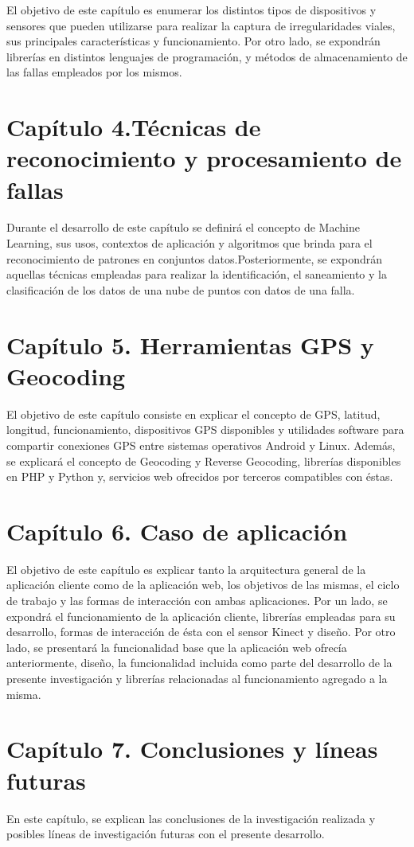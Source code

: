El objetivo de este capítulo es enumerar los distintos tipos de dispositivos y sensores que pueden utilizarse para realizar la captura de irregularidades viales, sus principales características y funcionamiento. 
Por otro lado, se expondrán librerías en distintos lenguajes de programación, y métodos de almacenamiento de las fallas empleados por los mismos.

\section*{Capítulo 4.Técnicas de reconocimiento y procesamiento de fallas}

Durante el desarrollo de este capítulo se definirá el concepto de Machine Learning, sus usos, contextos de aplicación y algoritmos que brinda para el reconocimiento de patrones en conjuntos datos.Posteriormente, se expondrán aquellas técnicas empleadas para realizar la identificación, el saneamiento y la clasificación de los datos de una nube de puntos con datos de una falla.

\section*{Capítulo 5. Herramientas GPS y Geocoding}

El objetivo de este capítulo consiste en explicar el concepto de GPS, latitud, longitud, funcionamiento, dispositivos GPS disponibles y utilidades software para compartir conexiones GPS entre sistemas operativos Android y Linux.
Además, se explicará el concepto de Geocoding y Reverse Geocoding, librerías disponibles en PHP y Python y, servicios web ofrecidos por terceros compatibles con éstas.

\section*{Capítulo 6. Caso de aplicación}

El objetivo de este capítulo es explicar tanto la arquitectura general de la aplicación cliente como de la aplicación web, los objetivos de las mismas, el ciclo de trabajo y las formas de interacción con ambas aplicaciones. 
Por un lado, se expondrá el funcionamiento de la aplicación cliente, librerías empleadas para su desarrollo, formas de interacción de ésta con el sensor Kinect y diseño.
Por otro lado, se presentará la funcionalidad base que la aplicación web ofrecía anteriormente, diseño, la funcionalidad incluida como parte del desarrollo de la presente investigación y librerías relacionadas al funcionamiento agregado a la misma. 

\section*{Capítulo 7. Conclusiones y líneas futuras}

En este capítulo, se explican las conclusiones de la investigación realizada y posibles líneas de investigación futuras con el presente desarrollo.